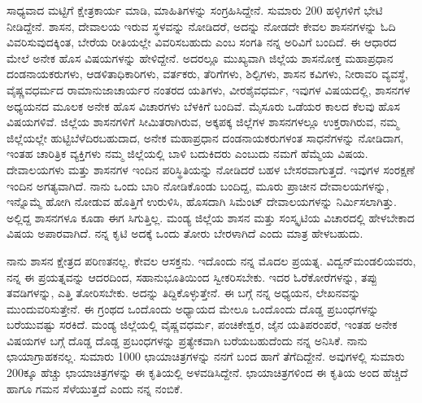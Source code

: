 ಸಾಧ್ಯವಾದ ಮಟ್ಟಿಗೆ ಕ್ಷೇತ್ರಕಾರ್ಯ ಮಾಡಿ, ಮಾಹಿತಿಗಳನ್ನು ಸಂಗ್ರಹಿಸಿದ್ದೇನೆ. ಸುಮಾರು 200 ಹಳ್ಳಿಗಳಿಗೆ ಭೇಟಿ ನೀಡಿದ್ದೇನೆ. ಶಾಸನ, ದೇವಾಲಯ ಇರುವ ಸ್ಥಳವನ್ನು ನೋಡಿದರೆ, ಅದನ್ನು ನೋಡದೇ ಕೇವಲ ಶಾಸನಗಳನ್ನು ಓದಿ ವಿವರಿಸುವುದಕ್ಕಿಂತ, ಬೇರೆಯ ರೀತಿಯಲ್ಲೇ ವಿವರಿಸಬಹುದು ಎಂಬ ಸಂಗತಿ ನನ್ನ ಅರಿವಿಗೆ ಬಂದಿದೆ. ಈ ಆಧಾರದ ಮೇಲೆ ಅನೇಕ ಹೊಸ ವಿಷಯಗಳನ್ನು ಹೇಳಿದ್ದೇನೆ. ಅದರಲ್ಲೂ ಮುಖ್ಯವಾಗಿ ಜಿಲ್ಲೆಯ ಶಾಸನೋಕ್ತ ಮಹಾಪ್ರಧಾನ ದಂಡನಾಯಕರುಗಳು, ಆಡಳಿತಾಧಿಕಾರಿಗಳು, ವರ್ತಕರು, ತೆರಿಗೆಗಳು, ಶಿಲ್ಪಿಗಳು, ಶಾಸನ ಕವಿಗಳು, ನೀರಾವರಿ ವ್ಯವಸ್ಥೆ, ವೈಷ್ಣವಧರ್ಮದ ರಾಮಾನುಜಾಚಾರ್ಯರ ನಂತರದ ಯತಿಗಳು, ವೀರಶೈವಧರ್ಮ, ಇವುಗಳ ವಿಷಯದಲ್ಲಿ, ಶಾಸನಗಳ ಅಧ್ಯಯನದ ಮೂಲಕ ಅನೇಕ ಹೊಸ ವಿಚಾರಗಳು ಬೆಳಕಿಗೆ ಬಂದಿವೆ. ಮೈಸೂರು ಒಡೆಯರ ಕಾಲದ ಕೆಲವು ಹೊಸ ವಿಷಯಗಳಿವೆ. ಜಿಲ್ಲೆಯ ಶಾಸನಗಳಿಗೆ ಸೀಮಿತರಾಗಿರುವ, ಅಕ್ಕಪಕ್ಕ ಜಿಲ್ಲೆಗಳ ಶಾಸನಗಳಲ್ಲೂ ಉಕ್ತರಾಗಿರುವ, ನಮ್ಮ ಜಿಲ್ಲೆಯಲ್ಲೇ ಹುಟ್ಟಿಬೆಳೆದಿರಬಹುದಾದ, ಅನೇಕ ಮಹಾಪ್ರಧಾನ ದಂಡನಾಯಕರುಗಳಂತ ಸಾಧನೆಗಳನ್ನು ನೋಡಿದಾಗ, ಇಂತಹ ಚಾರಿತ್ರಿಕ ವ್ಯಕ್ತಿಗಳು ನಮ್ಮ ಜಿಲ್ಲೆಯಲ್ಲಿ ಬಾಳಿ ಬದುಕಿದರು ಎಂಬುದು ನಮಗೆ ಹೆಮ್ಮೆಯ ವಿಷಯ. ದೇವಾಲಯಗಳು ಮತ್ತು ಶಾಸನಗಳ ಇಂದಿನ ಪರಿಸ್ಥಿತಿಯನ್ನು ನೋಡಿದರೆ ಬಹಳ ಬೇಸರವಾಗುತ್ತದೆ. ಇವುಗಳ ಸಂರಕ್ಷಣೆ ಇಂದಿನ ಅಗತ್ಯವಾಗಿದೆ. ನಾನು ಒಂದು ಬಾರಿ ನೋಡಿಕೊಂಡು ಬಂದಿದ್ದ, ಮೂರು ಪ್ರಾಚೀನ ದೇವಾಲಯಗಳನ್ನು, ಇನ್ನೊಮ್ಮೆ ಹೋಗಿ ನೋಡುವ ಹೊತ್ತಿಗೆ ಉರುಳಿಸಿ, ಹೊಸದಾಗಿ ಸಿಮೆಂಟ್​ ದೇವಾಲಯಗಳನ್ನು ನಿರ್ಮಿಸಲಾಗಿತ್ತು. ಅಲ್ಲಿದ್ದ ಶಾಸನಗಳೂ ಕೂಡಾ ಈಗ ಸಿಗುತ್ತಿಲ್ಲ. ಮಂಡ್ಯ ಜಿಲ್ಲೆಯ ಶಾಸನ ಮತ್ತು ಸಂಸ್ಕೃಟಿಯ ವಿಚಾರದಲ್ಲಿ ಹೇಳಬೇಕಾದ ವಿಷಯ ಅಪಾರವಾಗಿದೆ. ನನ್ನ ಕೃಟಿ ಅದಕ್ಕೆ ಒಂದು ತೋರು ಬೇರಳಾಗಿದೆ ಎಂದು ಮಾತ್ರ ಹೇಳಬಹುದು.

ನಾನು ಶಾಸನ ಕ್ಷೇತ್ರದ ಪರಿಣತನಲ್ಲ. ಕೇವಲ ಆಸಕ್ತನು. ಇದೊಂದು ನನ್ನ ಮೊದಲ ಪ್ರಯತ್ನ. ವಿದ್ವನ್​ ಮಂಡಲಿಯವರು, ನನ್ನ ಈ ಪ್ರಯತ್ನವನ್ನು ಆದರದಿಂದ, ಸಹಾನುಭೂತಿಯಿಂದ ಸ್ವೀಕರಿಸಬೇಕು. ಇದರ ಓರೆಕೋರೆಗಳನ್ನು, ತಪ್ಪು ತವಡಿಗಳನ್ನು, ಎತ್ತಿ ತೋರಿಸಬೇಕು. ಅದನ್ನು ತಿದ್ದಿಕೊಳ್ಳುತ್ತೇನೆ. ಈ ಬಗ್ಗೆ ನನ್ನ ಅಧ್ಯಯನ, ಲೇಖನವನ್ನು ಮುಂದುವರಿಸುತ್ತೇನೆ. ಈ ಗ್ರಂಥದ ಒಂದೊಂದು ಅಧ್ಯಾಯದ ಮೇಲೂ ಒಂದೊಂದು ದೊಡ್ಡ ಪ್ರಬಂಧಗಳನ್ನು ಬರೆಯುವಷ್ಟು ಸರಕಿದೆ. ಮಂಡ್ಯ ಜಿಲ್ಲೆಯಲ್ಲಿ ವೈಷ್ಣವಧರ್ಮ, ಪಂಚಿಕೇಶ್ವರ, ಜೈನ ಯತಿಪರಂಪರೆ, ಇಂತಹ ಅನೇಕ ವಿಷಯಗಳ ಬಗ್ಗೆ ದೊಡ್ಡ ದೊಡ್ಡ ಪ್ರಬಂಧಗಳನ್ನು ಪ್ರತ್ಯೇಕವಾಗಿ ಬರೆಯಬಹುದೆಂದು ನನ್ನ ಅನಿಸಿಕೆ. ನಾನು ಛಾಯಾಗ್ರಾಹಕನಲ್ಲ. ಸುಮಾರು 1000 ಛಾಯಾಚಿತ್ರಗಳನ್ನು ನನಗೆ ಬಂದ ಹಾಗೆ ತೆಗೆದಿದ್ದೇನೆ. ಅವುಗಳಲ್ಲಿ ಸುಮಾರು 200ಕ್ಕೂ ಹೆಚ್ಚು ಛಾಯಾಚಿತ್ರಗಳನ್ನು ಈ ಕೃತಿಯಲ್ಲಿ ಅಳವಡಿಸಿದ್ದೇನೆ. ಛಾಯಾಚಿತ್ರಗಳಿಂದ ಈ ಕೃತಿಯ ಅಂದ ಹೆಚ್ಚಿದೆ ಹಾಗೂ ಗಮನ ಸೆಳೆಯುತ್ತದೆ ಎಂದು ನನ್ನ ನಂಬಿಕೆ.

